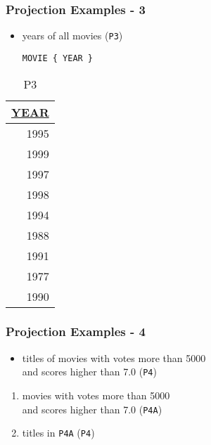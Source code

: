 \documentclass[dvipsnames]{beamer}
\theoremstyle{plain}
\begin{document}
\begin{frame}[fragile]
  \frametitle{Projection Examples - 3}

  \begin{itemize}
    \item years of all movies (\texttt{P3})
    \begin{lstlisting}
MOVIE { YEAR }
    \end{lstlisting}
  \end{itemize}

  \vspace{-10pt}
  \begin{tiny}
  \begin{table}
    \caption{P3}
    \begin{tabular}{|r|}\hline
\underline{YEAR}\\[2pt]\hline\hline
            1995\\\hline
            1999\\\hline
            1997\\\hline
            1998\\\hline
            1994\\\hline
            1988\\\hline
            1991\\\hline
            1977\\\hline
            1990\\\hline
    \end{tabular}
  \end{table}
  \end{tiny}
\end{frame}

\begin{frame}
  \frametitle{Projection Examples - 4}

  \begin{itemize}
    \item titles of movies with votes more than 5000\\
      and scores higher than 7.0 (\texttt{P4})
  \end{itemize}

  \pause
  \begin{enumerate}
    \item movies with votes more than 5000\\
      and scores higher than 7.0 (\texttt{P4A})
    \item titles in \texttt{P4A} (\texttt{P4})
  \end{enumerate}
\end{frame}
\end{document}
